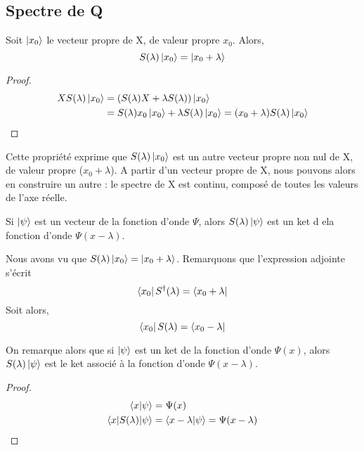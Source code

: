 \documentclass[../Notesdecours.tex]{subfiles}
\begin{document}
\subsection{Spectre de Q}

\begin{Property}
	Soit $\ket{x_0}$ le vecteur propre de X, de valeur propre $x_0$. Alors,
	\begin{equation}
		S(\lambda)\ket{x_0} = \ket{x_0+\lambda}
	\end{equation}
\end{Property}
\begin{proof}
	\begin{align*}
		XS(\lambda)\ket{x_0} &= (S(\lambda)X+\lambda S(\lambda))\ket{x_0}\\
		&= S(\lambda)x_0\ket{x_0} + \lambda S(\lambda)\ket{x_0} = (x_0+\lambda)S(\lambda)\ket{x_0}
	\end{align*}
\end{proof}

Cette propriété exprime que $S(\lambda)\ket{x_0}$ est un autre vecteur propre non nul de X, de valeur propre ($x_0+\lambda$). A partir d'un vecteur propre de X, nous pouvons alors en construire un autre : le spectre de X est continu, composé de toutes les valeurs de l'axe réelle.

\begin{Property}
	Si $\ket{\psi}$ est un vecteur de la fonction d'onde $\Psi$, alors $S(\lambda)\ket{\psi}$ est un ket d ela fonction d'onde $\Psi(x-\lambda)$.
\end{Property}

\begin{remark}
	Nous avons vu que $S(\lambda)\ket{x_0} = \ket{x_0+\lambda}$. Remarquons que l'expression adjointe s'écrit
	\begin{equation}
		\bra{x_0}S^\dagger (\lambda) = \bra{x_0+\lambda}
	\end{equation}
	Soit alors,
	\begin{equation}
		\bra{x_0}S(\lambda) = \bra{x_0-\lambda}
	\end{equation}
\end{remark}

\begin{Property}
	On remarque alors que si $\ket{\psi}$ est un ket de la fonction d'onde $\Psi(x)$, alors $S(\lambda)\ket{\psi}$ est le ket associé à la fonction d'onde $\Psi(x-\lambda)$.
\end{Property}
\begin{proof}
	\begin{align*}
		\braket{x|\psi} &= \Psi(x)\\
		\braket{x|S(\lambda)|\psi} &= \braket{x-\lambda|\psi} = \Psi(x-\lambda)
	\end{align*}
\end{proof}
\end{document}
